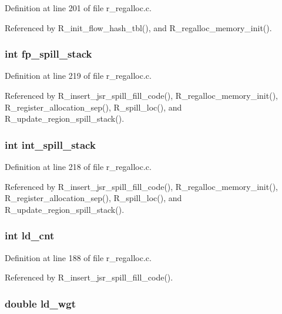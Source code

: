 Definition at line 201 of file r\_\-regalloc.c.

Referenced by R\_\-init\_\-flow\_\-hash\_\-tbl(), and R\_\-regalloc\_\-memory\_\-init().
\subsubsection{\setlength{\rightskip}{0pt plus 5cm}int \bf{fp\_\-spill\_\-stack}}\label{r__regalloc_8h_058f50532dbe9ee564bfc6fd53829878}




Definition at line 219 of file r\_\-regalloc.c.

Referenced by R\_\-insert\_\-jsr\_\-spill\_\-fill\_\-code(), R\_\-regalloc\_\-memory\_\-init(), R\_\-register\_\-allocation\_\-sep(), R\_\-spill\_\-loc(), and R\_\-update\_\-region\_\-spill\_\-stack().
\subsubsection{\setlength{\rightskip}{0pt plus 5cm}int \bf{int\_\-spill\_\-stack}}\label{r__regalloc_8h_4cbe8b90de02945ccbcd6b4b0aa4df2e}




Definition at line 218 of file r\_\-regalloc.c.

Referenced by R\_\-insert\_\-jsr\_\-spill\_\-fill\_\-code(), R\_\-regalloc\_\-memory\_\-init(), R\_\-register\_\-allocation\_\-sep(), R\_\-spill\_\-loc(), and R\_\-update\_\-region\_\-spill\_\-stack().
\subsubsection{\setlength{\rightskip}{0pt plus 5cm}int \bf{ld\_\-cnt}}\label{r__regalloc_8h_b12189c686485593a22fead8b67c32ef}




Definition at line 188 of file r\_\-regalloc.c.

Referenced by R\_\-insert\_\-jsr\_\-spill\_\-fill\_\-code().
\subsubsection{\setlength{\rightskip}{0pt plus 5cm}double \bf{ld\_\-wgt}}\label{r__regalloc_8h_9909e0445ef838082b0c63a06a731d2b}




